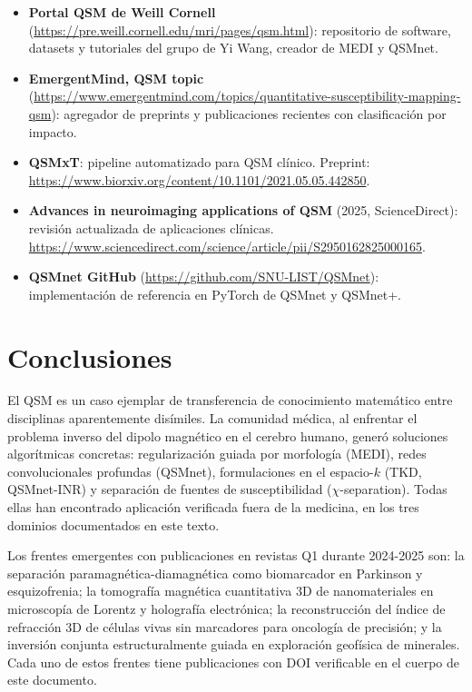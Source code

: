 \documentclass[12pt, a4paper]{article}
\begin{document}
\begin{itemize}[leftmargin=2em, itemsep=4pt]
  \item \textbf{Portal QSM de Weill Cornell} (\url{https://pre.weill.cornell.edu/mri/pages/qsm.html}): repositorio de software, datasets y tutoriales del grupo de Yi Wang, creador de MEDI y QSMnet.
  \item \textbf{EmergentMind, QSM topic} (\url{https://www.emergentmind.com/topics/quantitative-susceptibility-mapping-qsm}): agregador de preprints y publicaciones recientes con clasificación por impacto.
  \item \textbf{QSMxT}: pipeline automatizado para QSM clínico. Preprint: \url{https://www.biorxiv.org/content/10.1101/2021.05.05.442850}.
  \item \textbf{Advances in neuroimaging applications of QSM} (2025, ScienceDirect): revisión actualizada de aplicaciones clínicas. \url{https://www.sciencedirect.com/science/article/pii/S2950162825000165}.
  \item \textbf{QSMnet GitHub} (\url{https://github.com/SNU-LIST/QSMnet}): implementación de referencia en PyTorch de QSMnet y QSMnet+.
\end{itemize}

\section{Conclusiones}

El QSM es un caso ejemplar de transferencia de conocimiento matemático entre disciplinas aparentemente disímiles. La comunidad médica, al enfrentar el problema inverso del dipolo magnético en el cerebro humano, generó soluciones algorítmicas concretas: regularización guiada por morfología (MEDI), redes convolucionales profundas (QSMnet), formulaciones en el espacio-$k$ (TKD, QSMnet-INR) y separación de fuentes de susceptibilidad ($\chi$-separation). Todas ellas han encontrado aplicación verificada fuera de la medicina, en los tres dominios documentados en este texto.

Los frentes emergentes con publicaciones en revistas Q1 durante 2024-2025 son: la separación paramagnética-diamagnética como biomarcador en Parkinson y esquizofrenia; la tomografía magnética cuantitativa 3D de nanomateriales en microscopía de Lorentz y holografía electrónica; la reconstrucción del índice de refracción 3D de células vivas sin marcadores para oncología de precisión; y la inversión conjunta estructuralmente guiada en exploración geofísica de minerales. Cada uno de estos frentes tiene publicaciones con DOI verificable en el cuerpo de este documento.
\end{document}
